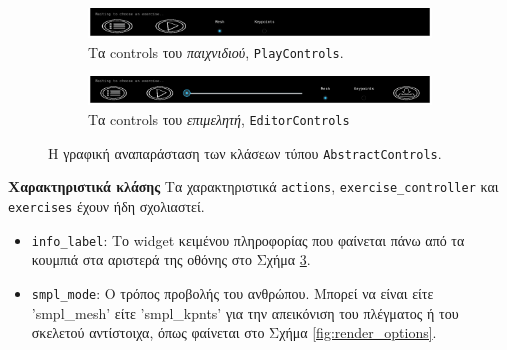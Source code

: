 \begin{figure}[h]
	\centering
	\begin{subfigure}[h]{0.45\textwidth}
		\centering
		\includegraphics[width=\textwidth]{images/chapter5/play_controls.png}
		\caption{Τα controls του \textsl{παιχνιδιού}, \texttt{PlayControls}.}
		\label{fig:play_controls}
	\end{subfigure}
	\hfill
	\begin{subfigure}[h]{0.45\textwidth}
		\centering
		\includegraphics[width=\textwidth]{images/chapter5/editor_controls.png}
		\caption{Τα controls του \textsl{επιμελητή}, \texttt{EditorControls}}
		\label{fig:editor_controls}
	\end{subfigure}
	\caption{Η γραφική αναπαράσταση των κλάσεων τύπου \texttt{AbstractControls}.}
	\label{fig:controls_ui}
\end{figure}

\noindent\textbf{Χαρακτηριστικά κλάσης}
Τα χαρακτηριστικά \texttt{actions}, \texttt{exercise\_controller} και \texttt{exercises} έχουν ήδη σχολιαστεί.
\begin{itemize}
	\item \texttt{info\_label}: Το widget κειμένου πληροφορίας που φαίνεται πάνω από τα κουμπιά στα αριστερά της οθόνης στο Σχήμα \ref{fig:controls_ui}.
	\item \texttt{smpl\_mode}: Ο τρόπος προβολής του ανθρώπου. Μπορεί να είναι είτε 'smpl\_mesh' είτε 'smpl\_kpnts' για την απεικόνιση του πλέγματος ή του σκελετού αντίστοιχα, όπως φαίνεται στο Σχήμα \ref{fig:render_options}.
\end{itemize}

